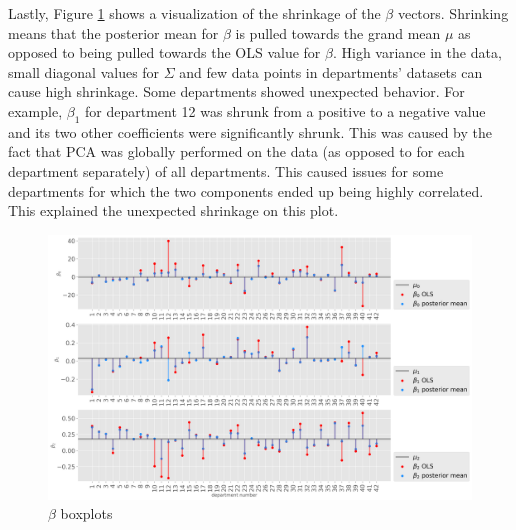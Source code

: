 \documentclass[paper=a4, fontsize=11pt]{scrartcl}
\begin{document}
Lastly, Figure \ref{shrink} shows a visualization of the shrinkage of the $\beta$ vectors. Shrinking means that the posterior mean for $\beta$ is pulled towards the grand mean $\mu$ as opposed to being pulled towards the OLS value for $\beta$. High variance in the data, small diagonal values for $\Sigma$ and few data points in departments' datasets can cause high shrinkage. Some departments showed unexpected behavior. For example, $\beta_1$ for department 12 was shrunk from a positive to a negative value and its two other coefficients were significantly shrunk. This was caused by the fact that PCA was globally performed on the data (as opposed to for each department separately) of all departments. This caused issues for some departments for which the two components ended up being highly correlated. This explained the unexpected shrinkage on this plot.

\begin{figure}[!htb]\label{shrink}
\centering
\includegraphics[width=1\textwidth]{project/writeup/shrinkage.png}
\caption{$\beta$ boxplots}
\end{figure}





 

\end{document}

